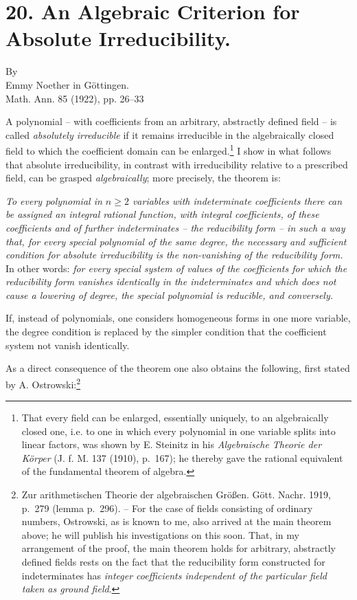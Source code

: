 \documentclass[11pt]{article}
\begin{document}
\section*{20. An Algebraic Criterion for Absolute Irreducibility.}
\begin{center}
By\\[0.25em]
Emmy Noether in Göttingen.\\[0.6em]
Math. Ann. 85 (1922), pp. 26--33
\end{center}

A polynomial -- with coefficients from an arbitrary, abstractly defined field -- is called \emph{absolutely irreducible} if it remains irreducible in the algebraically closed field to which the coefficient domain can be enlarged.\footnote{That every field can be enlarged, essentially uniquely, to an algebraically closed one, i.e. to one in which every polynomial in one variable splits into linear factors, was shown by E. Steinitz in his \emph{Algebraische Theorie der Körper} (J. f. M. 137 (1910), p.~167); he thereby gave the rational equivalent of the fundamental theorem of algebra.} I show in what follows that absolute irreducibility, in contrast with irreducibility relative to a prescribed field, can be grasped \emph{algebraically}; more precisely, the theorem is:

\emph{To every polynomial in $n\ge2$ variables with indeterminate coefficients there can be assigned an integral rational function, with integral coefficients, of these coefficients and of further indeterminates -- the reducibility form -- in such a way that, for every special polynomial of the same degree, the necessary and sufficient condition for absolute irreducibility is the non-vanishing of the reducibility form.} In other words: \emph{for every special system of values of the coefficients for which the reducibility form vanishes identically in the indeterminates and which does not cause a lowering of degree, the special polynomial is reducible, and conversely.}

If, instead of polynomials, one considers homogeneous forms in one more variable, the degree condition is replaced by the simpler condition that the coefficient system not vanish identically.

As a direct consequence of the theorem one also obtains the following, first stated by A. Ostrowski:\footnote{Zur arithmetischen Theorie der algebraischen Größen. Gött. Nachr. 1919, p.~279 (lemma p.~296). -- For the case of fields consisting of ordinary numbers, Ostrowski, as is known to me, also arrived at the main theorem above; he will publish his investigations on this soon. That, in my arrangement of the proof, the main theorem holds for arbitrary, abstractly defined fields rests on the fact that the reducibility form constructed for indeterminates has \emph{integer coefficients independent of the particular field taken as ground field}.}
\end{document}
